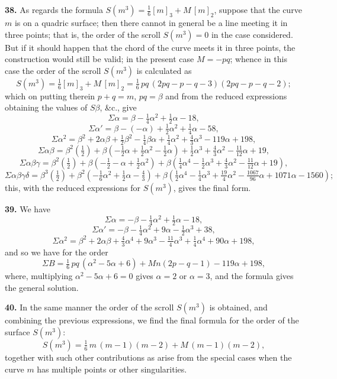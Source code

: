 \documentclass[11pt,a4paper]{article}
\begin{document}
\textbf{38.} As regards the formula $S(m^3) = \frac{1}{6}[m]_3 + M\,[m]_2$, suppose that the curve $m$ is on a quadric surface; then there cannot in general be a line meeting it in three points; that is, the order of the scroll $S(m^3) = 0$ in the case considered. But if it should happen that the chord of the curve meets it in three points, the construction would still be valid; in the present case $M = -pq$; whence in this case the order of the scroll $S(m^3)$ is calculated as
\[
S(m^3) = \tfrac{1}{6}[m]_3 + M\,[m]_2 = \tfrac{1}{6}\,pq\,(2p q - p - q - 3)(2 p q - p - q - 2);
\]
which on putting therein $p+q=m$, $pq=\beta$ and from the reduced expressions obtaining the values of $S\beta$, \&c., give
\[
\Sigma\alpha = \beta - \tfrac{1}{4}\alpha^2 + \tfrac{1}{2}\alpha - 18,
\]
\[
\Sigma\alpha' = \beta - (-\alpha) + \tfrac{1}{2}\alpha^2 + \tfrac{1}{4}\alpha - 58,
\]
\[
\Sigma\alpha^2 = \beta^2 + 2\alpha\beta + \tfrac{1}{2}\beta^2 - \tfrac{1}{4}\beta\alpha + \tfrac{1}{4}\alpha^2 + \tfrac{4}{3}\alpha^3 - 119\alpha + 198,
\]
\[
\Sigma\alpha\beta = \beta^2(\tfrac{1}{2}) + \beta(-\tfrac{1}{2}\alpha + \tfrac{1}{2}\alpha^2 - \tfrac{1}{2}\alpha) + \tfrac{1}{2}\alpha^3 + \tfrac{4}{3}\alpha^2 - \tfrac{11}{12}\alpha + 19,
\]
\[
\Sigma\alpha\beta\gamma = \beta^2(\tfrac{1}{2}) + \beta(-\tfrac{1}{2} - \alpha + \tfrac{1}{2}\alpha^2) + \beta(\tfrac{1}{4}\alpha^4 - \tfrac{1}{2}\alpha^3 + \tfrac{4}{3}\alpha^2 - \tfrac{11}{12}\alpha + 19),
\]
\[
\Sigma\alpha\beta\gamma\delta = \beta^3(\tfrac{1}{2}) + \beta^2(-\tfrac{1}{6}\alpha^2 + \tfrac{1}{2}\alpha - \tfrac{4}{3}) + \beta(\tfrac{1}{2}\alpha^4 - \tfrac{1}{4}\alpha^3 + \tfrac{19}{4}\alpha^2 - \tfrac{1067}{96}\alpha + 1071\alpha - 1560);
\]
this, with the reduced expressions for $S(m^3)$, gives the final form.

\medskip

\textbf{39.} We have
\[
\Sigma\alpha = -\beta - \tfrac{1}{4}\alpha^2 + \tfrac{1}{2}\alpha - 18,
\]
\[
\Sigma\alpha' = -\beta - \tfrac{1}{4}\alpha^2 + 9\alpha - \tfrac{1}{2}\alpha^3 + 38,
\]
\[
\Sigma\alpha^2 = \beta^2 + 2\alpha\beta + \tfrac{4}{3}\alpha^4 + 9\alpha^3 - \tfrac{11}{4}\alpha^3 + \tfrac{1}{4}\alpha^4 + 90\alpha + 198,
\]
and so we have for the order
\[
\Sigma B = \tfrac{1}{6}\,pq\,(\alpha^2 - 5\alpha + 6) + Mn(2p - q - 1) - 119\alpha + 198,
\]
where, multiplying $\alpha^2 - 5\alpha + 6 = 0$ gives $\alpha = 2$ or $\alpha = 3$, and the formula gives the general solution.

\medskip

\textbf{40.} In the same manner the order of the scroll $S(m^3)$ is obtained, and combining the previous expressions, we find the final formula for the order of the surface $S(m^3)$:
\[
S(m^3) = \tfrac{1}{6}\,m\,(m-1)(m-2) + M\,(m-1)(m-2),
\]
together with such other contributions as arise from the special cases when the curve $m$ has multiple points or other singularities.
\end{document}
